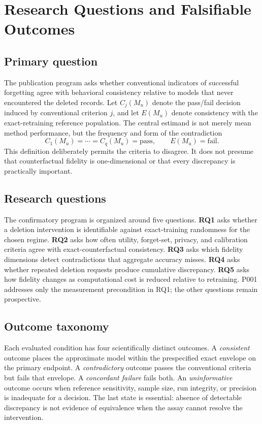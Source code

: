 \section{Research Questions and Falsifiable Outcomes}
\subsection{Primary question}
The publication program asks whether conventional indicators of successful forgetting
agree with behavioral consistency relative to models that never encountered the deleted
records.  Let $C_j(M_u)$ denote the pass/fail decision induced by conventional criterion
$j$, and let $E(M_u)$ denote consistency with the exact-retraining reference population.
The central estimand is not merely mean method performance, but the frequency and form of
the contradiction
\begin{equation}
  C_1(M_u)=\cdots=C_q(M_u)=\mathrm{pass},\qquad
  E(M_u)=\mathrm{fail}.
\end{equation}
This definition deliberately permits the criteria to disagree.  It does not presume that
counterfactual fidelity is one-dimensional or that every discrepancy is practically
important.

\subsection{Research questions}
The confirmatory program is organized around five questions.  \textbf{RQ1} asks whether a
deletion intervention is identifiable against exact-training randomness for the chosen
regime.  \textbf{RQ2} asks how often utility, forget-set, privacy, and calibration criteria
agree with exact-counterfactual consistency.  \textbf{RQ3} asks which fidelity dimensions
detect contradictions that aggregate accuracy misses.  \textbf{RQ4} asks whether repeated
deletion requests produce cumulative discrepancy.  \textbf{RQ5} asks how fidelity changes
as computational cost is reduced relative to retraining.  P001 addresses only the
measurement precondition in RQ1; the other questions remain prospective.

\subsection{Outcome taxonomy}
Each evaluated condition has four scientifically distinct outcomes.  A \emph{consistent}
outcome places the approximate model within the prespecified exact envelope on the primary
endpoint.  A \emph{contradictory} outcome passes the conventional criteria but fails that
envelope.  A \emph{concordant failure} fails both.  An \emph{uninformative} outcome occurs
when reference sensitivity, sample size, run integrity, or precision is inadequate for a
decision.  The last state is essential: absence of detectable discrepancy is not evidence
of equivalence when the assay cannot resolve the intervention.


